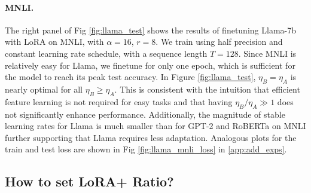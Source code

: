 \paragraph{MNLI.}  The right panel of Fig \ref{fig:llama_test} shows the results of finetuning Llama-7b with LoRA on MNLI, with $\alpha = 16$, $r = 8$. We train using half precision and constant learning rate schedule, with a sequence length $T=128$. Since MNLI is relatively easy for Llama, we finetune for only one epoch, which is sufficient for the model to reach its peak test accuracy. In Figure \ref{fig:llama_test}, $\eta_B = \eta_A$ is nearly optimal for all $\eta_B \geq \eta_A$. This is consistent with the intuition that efficient feature learning is not required for easy tasks and that having $\eta_B / \eta_A \gg 1$ does not significantly enhance performance. Additionally, the magnitude of stable learning rates for Llama is much smaller than for GPT-2 and RoBERTa on MNLI further supporting that Llama requires less adaptation. Analogous plots for the train and test loss are shown in Fig  \ref{fig:llama_mnli_loss} in \cref{app:add_exps}.

\subsection{How to set LoRA+ Ratio?}


